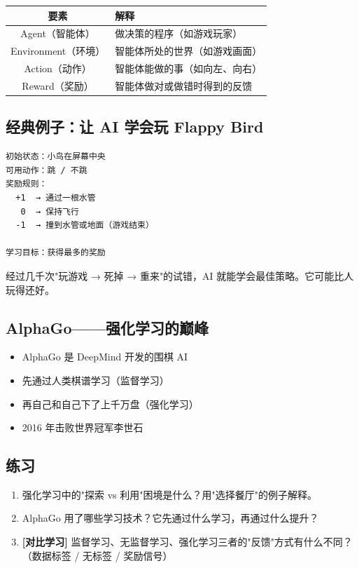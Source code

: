 \documentclass[a4paper,12pt]{ctexart}
\begin{document}
\begin{center}
\begin{tabular}{|c|l|}
\hline
\textbf{要素} & \textbf{解释} \\ \hline
Agent（智能体） & 做决策的程序（如游戏玩家） \\ \hline
Environment（环境） & 智能体所处的世界（如游戏画面） \\ \hline
Action（动作） & 智能体能做的事（如向左、向右） \\ \hline
Reward（奖励） & 智能体做对或做错时得到的反馈 \\ \hline
\end{tabular}
\end{center}

\subsection*{经典例子：让 AI 学会玩 Flappy Bird}

\begin{verbatim}
初始状态：小鸟在屏幕中央
可用动作：跳 / 不跳
奖励规则：
  +1  → 通过一根水管
   0  → 保持飞行
  -1  → 撞到水管或地面（游戏结束）
  
学习目标：获得最多的奖励
\end{verbatim}

经过几千次"玩游戏 → 死掉 → 重来"的试错，AI 就能学会最佳策略。它可能比人玩得还好。

\subsection*{AlphaGo——强化学习的巅峰}

\begin{itemize}
  \item AlphaGo 是 DeepMind 开发的围棋 AI
  \item 先通过人类棋谱学习（监督学习）
  \item 再自己和自己下了上千万盘（强化学习）
  \item 2016 年击败世界冠军李世石
\end{itemize}

\subsection*{练习}

\begin{enumerate}
  \item 强化学习中的"探索 vs 利用"困境是什么？用"选择餐厅"的例子解释。
  \item AlphaGo 用了哪些学习技术？它先通过什么学习，再通过什么提升？
  \item \textbf{[对比学习]} 监督学习、无监督学习、强化学习三者的"反馈"方式有什么不同？（数据标签 / 无标签 / 奖励信号）
\end{enumerate}
\end{document}
